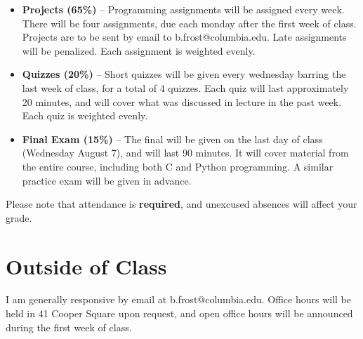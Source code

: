 \documentclass{article}
\begin{document}
\begin{itemize}

	\item \textbf{Projects (65\%)} -- Programming assignments will be assigned every week. There will be four assignments, due each monday after the first week of class. Projects are to be sent by email to b.frost@columbia.edu. Late assignments will be penalized. Each assignment is weighted evenly.
	\item \textbf{Quizzes (20\%)} -- Short quizzes will be given every wednesday barring the last week of class, for a total of 4 quizzes. Each quiz will last approximately 20 minutes, and will cover what was discussed in lecture in the past week. Each quiz is weighted evenly.
	\item \textbf{Final Exam (15\%)} -- The final will be given on the last day of class (Wednesday August 7), and will last 90 minutes. It will cover material from the entire course, including both C and Python programming. A similar practice exam will be given in advance.

\end{itemize}

Please note that attendance is \textbf{required}, and unexcused absences will affect your grade.

\section*{Outside of Class}

I am generally responsive by email at b.frost@columbia.edu. Office hours will be held in 41 Cooper Square upon request, and open office hours will be announced during the first week of class.
\end{document}
